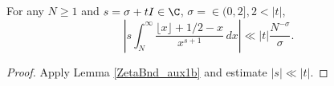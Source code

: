 \begin{lemma}
\label{ZetaBnd_aux1p}
\leanok
For any $N\ge1$ and $s = \sigma + tI \in \C$, $\sigma=\in(0,2], 2 < |t|$,
  $$
  \left| s\int_N^\infty \frac{\lfloor x\rfloor + 1/2 - x}{x^{s+1}} \, dx \right|
  \ll |t| \frac{N^{-\sigma}}{\sigma}.
  $$
\end{lemma}
\begin{proof}
\leanok
Apply Lemma \ref{ZetaBnd_aux1b} and estimate $|s|\ll |t|$.
\end{proof}
